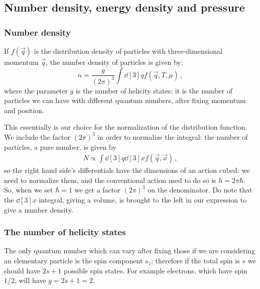 \documentclass[main.tex]{subfiles}
\begin{document}
\subsection{Number density, energy density and pressure}

\subsubsection{Number density}

If \(f(\vec{q})\) is the distribution density of particles with three-dimensional momentum \(\vec{q}\), the number density of particles is given by: 
%
\begin{equation}\label{eq:number-density-momentum-space}
  n = \frac{g}{(2 \pi )^3} \int \dd[3]{q} f(\vec{q}, T, \mu )
\,,
\end{equation}
%
where the parameter \(g\) is the number of helicity states: it is the number of particles we can have with different quantum numbers, after fixing momentum and position. 

This essentially is our choice for the normalization of the distribution function. 
We include the factor \((2\pi)^3 \) in order to normalize the integral: the number of particles, a pure number, is given by
%
\begin{align}
N \propto \int \dd[3]{q} \dd[3]{x}  f(\vec{q}, \vec{x})
\,,
\end{align}
%
so the right hand side's differentials have the dimensions of an action cubed: we need to normalize them, and the conventional action used to do so is \(h = 2 \pi \hbar\).
So, when we set \(\hbar = 1\) we get a factor \((2\pi )^3\) on the denominator. 
Do note that the \(\dd[3]{x}\) integral, giving a volume, is brought to the left in our expression to give a number density. 

\subsubsection{The number of helicity states}

The only quantum number which can vary after fixing those if we are considering an elementary particle is the spin component \(s_z\); therefore if the total spin is \(s\) we should have \(2s+1\) possible spin states.
For example  electrons, which have spin \(1/2\), will have \(g = 2s+1 = 2\). 

\end{document}
